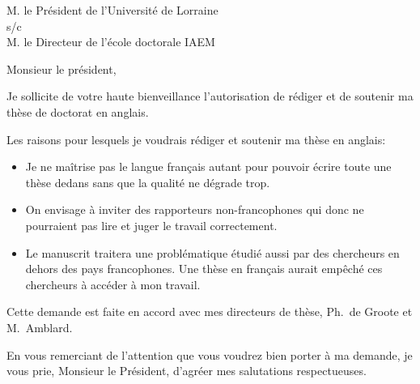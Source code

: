 \documentclass[11pt]{lettre}
\makeatletter
\newcommand*{\NoRule}{\renewcommand*{\rule@length}{0}}
\makeatother
\begin{document}
\begin{letter}{M. le Président de l'Université de Lorraine \\
               s/c \\
               M. le Directeur de l'école doctorale IAEM}
\NoRule
{}
\signature{Jirka Maršík \\ Doctorant au Loria}
\address{Jiří Maršík \\ Loria \\ Campus Scientifique \\ BP 239 \\ 54506 Vandoeuvre-lès-Nancy}
\nofax

\def\concname{Objet :~} %

\opening{Monsieur le président,}

Je sollicite de votre haute bienveillance l’autorisation de rédiger et de
soutenir ma thèse de doctorat en anglais.

Les raisons pour lesquels je voudrais rédiger et soutenir ma thèse en
anglais:

\begin{itemize}
\item Je ne maîtrise pas le langue français autant pour pouvoir écrire
  toute une thèse dedans sans que la qualité ne dégrade trop.
\item On envisage à inviter des rapporteurs non-francophones qui donc ne
  pourraient pas lire et juger le travail correctement.
\item Le manuscrit traitera une problématique étudié aussi par des
  chercheurs en dehors des pays francophones. Une thèse en français aurait
  empêché ces chercheurs à accéder à mon travail.
\end{itemize}

Cette demande est faite en accord avec mes directeurs de thèse, Ph.\ de
Groote et M.\ Amblard.

\closing{En vous remerciant de l’attention que vous voudrez bien porter à
  ma demande, je vous prie, Monsieur le Président, d’agréer mes salutations
  respectueuses.}

\end{letter}
\end{document}
